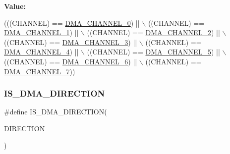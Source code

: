 {\bfseries Value\+:}
\begin{DoxyCode}
(((CHANNEL) == \mbox{\hyperlink{group___d_m_a___channel__selection_gabd7de138931e93a90fc6c4eab5916bbe}{DMA\_CHANNEL\_0}}) || \(\backslash\)
                                 ((CHANNEL) == \mbox{\hyperlink{group___d_m_a___channel__selection_ga283364370e9876af6406b9fa70e2944f}{DMA\_CHANNEL\_1}}) || \(\backslash\)
                                 ((CHANNEL) == \mbox{\hyperlink{group___d_m_a___channel__selection_ga9688f3e78cbc2109d214b7ca049e22df}{DMA\_CHANNEL\_2}}) || \(\backslash\)
                                 ((CHANNEL) == \mbox{\hyperlink{group___d_m_a___channel__selection_gac689673fec4d72ede49a0d657e3a7e70}{DMA\_CHANNEL\_3}}) || \(\backslash\)
                                 ((CHANNEL) == \mbox{\hyperlink{group___d_m_a___channel__selection_ga51b51f5b39e23b28ad99520ad5be596f}{DMA\_CHANNEL\_4}}) || \(\backslash\)
                                 ((CHANNEL) == \mbox{\hyperlink{group___d_m_a___channel__selection_gafbaa82f3cff89858e50363c04ed0cca0}{DMA\_CHANNEL\_5}}) || \(\backslash\)
                                 ((CHANNEL) == \mbox{\hyperlink{group___d_m_a___channel__selection_gad23679661d8da3bc1aaacc62f99821f7}{DMA\_CHANNEL\_6}}) || \(\backslash\)
                                 ((CHANNEL) == \mbox{\hyperlink{group___d_m_a___channel__selection_ga77ff4e8675a3991feb20e385242f34ab}{DMA\_CHANNEL\_7}}))
\end{DoxyCode}
\mbox{\label{group___d_m_a___private___macros_gae2b02e8e823854bcd7c5746cdd29e70d}} 
\subsubsection{\texorpdfstring{I\+S\+\_\+\+D\+M\+A\+\_\+\+D\+I\+R\+E\+C\+T\+I\+ON}{IS\_DMA\_DIRECTION}}
{\footnotesize\ttfamily \#define I\+S\+\_\+\+D\+M\+A\+\_\+\+D\+I\+R\+E\+C\+T\+I\+ON(\begin{DoxyParamCaption}\item[{}]{D\+I\+R\+E\+C\+T\+I\+ON }\end{DoxyParamCaption})}


